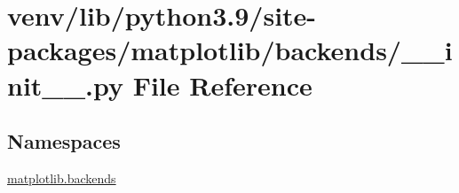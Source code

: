 \hypertarget{venv_2lib_2python3_89_2site-packages_2matplotlib_2backends_2____init_____8py}{}\section{venv/lib/python3.9/site-\/packages/matplotlib/backends/\+\_\+\+\_\+init\+\_\+\+\_\+.py File Reference}
\label{venv_2lib_2python3_89_2site-packages_2matplotlib_2backends_2____init_____8py}
\subsection*{Namespaces}
\begin{DoxyCompactItemize}
\item 
 \hyperlink{namespacematplotlib_1_1backends}{matplotlib.\+backends}
\end{DoxyCompactItemize}
